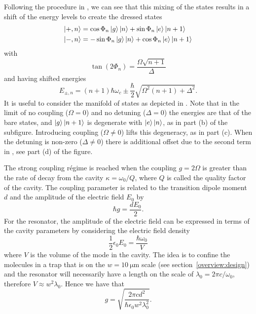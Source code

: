 Following the procedure in , we can see that this
mixing of the states results in a shift of the energy levels to create the
dressed states
%
\begin{align}
  \ket{+, n} &= \cos\Phi_n \ket{g}\ket{n} + \sin\Phi_n \ket{e}\ket{n+1} \\
  \ket{-, n} &= -\sin\Phi_n \ket{g}\ket{n} + \cos\Phi_n \ket{e}\ket{n+1}
\end{align}
%
with
%
\begin{equation}
  \tan(2\Phi_n) = \frac{\Omega\sqrt{n+1}}{\Delta}
\end{equation}
%
and having shifted energies
%
\begin{equation}
  E_{\pm, n} = (n+1)\hbar\omega_c \pm \frac{\hbar}{2}\sqrt{\Omega^2(n+1) +
  \Delta^2}.
  \label{theory:eqn:JCHenergies}
\end{equation}
%
It is useful to consider the manifold of states as depicted in
.  
Note that in the limit of no coupling
($\Omega = 0$) and no detuning ($\Delta = 0$) the energies are that of the bare
states, and $\ket{g}\ket{n+1}$ is degenerate with $\ket{e}\ket{n}$, as in part
(b) of the subfigure. Introducing coupling ($\Omega \neq 0$) lifts this
degeneracy, as in part (c). When the detuning is non-zero ($\Delta \neq 0$)
there is additional offset due to the second term in
, see part (d) of the figure.

The strong coupling r\'egime is reached when the coupling $g=2\Omega$ is
greater than the rate of decay from the cavity $\kappa = \omega_0 / Q$, where
$Q$ is called the quality factor of the cavity. The coupling parameter is
related to the transition dipole moment $d$ and the amplitude of the electric
field $E_0$ by
%
\begin{equation}
  \hbar g = \frac{d E_0}{2}.
\end{equation}
%
For the resonator, the amplitude of the electric field can be expressed in
terms of the cavity parameters by considering the electric field density
%
\begin{equation}
  \frac{1}{2} \epsilon_0 E_0 = \frac{\hbar \omega_0}{V}
\end{equation}
%
where $V$ is the volume of the mode in the cavity. The idea is to confine the
molecules in a trap that is on the $w=\SI{10}{\micro\meter}$ scale (see
section~\ref{overview:design}) and the resonator will necessarily have a length
on the scale of $\lambda_0 = 2\pi c / \omega_0$, therefore $V\approx
w^2\lambda_0$. Hence we have that
%
\begin{equation}
  g = \sqrt{\frac{2\pi c d^2}{\hbar \epsilon_0 w^2 \lambda_0^2}}.
\end{equation}

